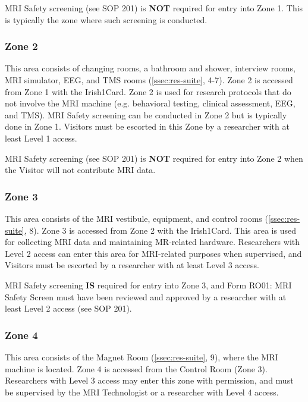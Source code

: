 \documentclass[11pt]{article}
\begin{document}
MRI Safety screening (see SOP 201) is \textbf{NOT} required for entry into Zone 1. This is typically the zone where such screening is conducted.

\subsubsection{Zone 2}
\label{sssec:safety-zones-2}

This area consists of changing rooms, a bathroom and shower, interview rooms, MRI simulator, EEG, and TMS rooms (\ref{ssec:res-suite}, 4-7). Zone 2 is accessed from Zone 1 with the Irish1Card. Zone 2 is used for research protocols that do not involve the MRI machine (e.g. behavioral testing, clinical assessment, EEG, and TMS). MRI Safety screening can be conducted in Zone 2 but is typically done in Zone 1. Visitors must be escorted in this Zone by a researcher with at least Level 1 access.

MRI Safety screening (see SOP 201) is \textbf{NOT} required for entry into Zone 2 when the Visitor will not contribute MRI data.


\subsubsection{Zone 3}
\label{sssec:safety-zones-3}

This area consists of the MRI vestibule, equipment, and control rooms (\ref{ssec:res-suite}, 8). Zone 3 is accessed from Zone 2 with the Irish1Card. This area is used for collecting MRI data and maintaining MR-related hardware. Researchers with Level 2 access can enter this area for MRI-related purposes when supervised, and Visitors must be escorted by a researcher with at least Level 3 access.

MRI Safety screening \textbf{IS} required for entry into Zone 3, and Form RO01: MRI Safety Screen must have been reviewed and approved by a researcher with at least Level 2 access (see SOP 201).


\subsubsection{Zone 4}
\label{sssec:safety-zones-4}

This area consists of the Magnet Room (\ref{ssec:res-suite}, 9), where the MRI machine is located. Zone 4 is accessed from the Control Room (Zone 3). Researchers with Level 3 access may enter this zone with permission, and must be supervised by the MRI Technologist or a researcher with Level 4 access.
\end{document}
